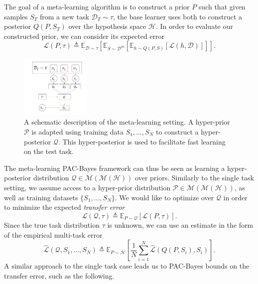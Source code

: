 \documentclass{article} %
\theoremstyle{definition}
\newcommand{\Expect}[2]{\mathbb{E}_{#1}\left [#2 \right ]}
\begin{document}
The goal of a meta-learning algorithm is to construct a prior $P$ such that given samples $S_T$ from a new task $\mathcal{D}_T\sim \tau$, the base learner uses both to construct a posterior $Q(P, S_T)$ over the hypothesis space $\mathcal{H}$. In order to evaluate our constructed prior, we can consider its expected error
%
\begin{equation}
\mathcal{L}(P, \tau)\triangleq \Expect{\mathcal{D}\sim \tau}{\Expect{S\sim \mathcal{D}^m}{\Expect{h\sim Q(P, S)}{\mathcal{L}(h, \mathcal{D})}}} .
\end{equation}
%
\begin{figure}[t]
	\centering
	\includegraphics[width=0.3\textwidth]{setup_ml.PNG}
	\caption{A schematic description of the meta-learning setting. A hyper-prior $\mathcal{P}$ is adapted using training data $S_1,\ldots,S_N$ to construct a hyper-posterior $\mathcal{Q}$. This hyper-posterior is used to facilitate fast learning on the test task.}
	\label{fig:meta-learning-setting}
\end{figure}
%
The meta-learning PAC-Bayes framework can thus be seen as learning a hyper-posterior distribution $\mathcal{Q}\in \mathcal{M}(\mathcal{M}(\mathcal{H}))$ over priors. Similarly to the single task setting, we assume access to a hyper-prior distribution $\mathcal{P}\in \mathcal{M}(\mathcal{M}(\mathcal{H}))$, as well as training datasets $\{S_1,...,S_N\}$.
We would like to optimize over $\mathcal{Q}$ in order to minimize the expected \emph{transfer error} 
$$
\mathcal{L}(\mathcal{Q}, \tau) \triangleq \Expect{P\sim \mathcal{Q}}{\mathcal{L}(P, \tau)} .
$$
Since the true task distribution $\tau$ is unknown, we can use an estimate in the form of the empirical multi-task error $$\hat{\mathcal{L}}(\mathcal{Q}, S_1,...,S_N)\triangleq \Expect{P\sim \mathcal{H}}{\frac{1}{N}\sum_{i=1}^{N}\hat{\mathcal{L}}(Q(P, S_i), S_i)} .$$
A similar approach to the single task case leads us to PAC-Bayes bounds on the transfer error, such as the following.
\end{document}
